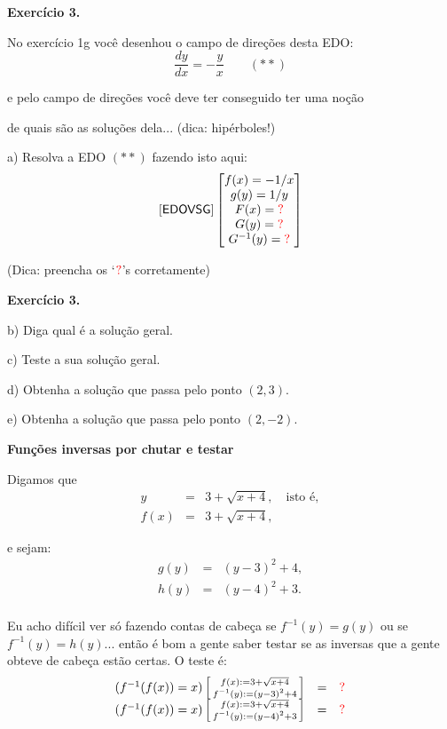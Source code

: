 \documentclass[oneside,12pt]{article}
\begin{document}
\newpage


{\bf Exercício 3.}

No exercício 1g você desenhou o campo de direções desta EDO:
%
$$ \frac{dy}{dx} = - \frac{y}{x} \qquad (**)$$

e pelo campo de direções você deve ter conseguido ter uma noção

de quais são as soluções dela... (dica: hipérboles!)

\msk

a) Resolva a EDO $(**)$ fazendo isto aqui:
%
$$\pfo{EDOVSG}
  \bmat{f(x) = -1/x \\
        g(y) = 1/y \\
        F(x) = \Rd{?} \\
        G(y) = \Rd{?} \\
        G^{-1}(y) = \Rd{?} \\
        }
$$

(Dica: preencha os `$\Rd{?}$'s corretamente)

\newpage

{\bf Exercício 3.}

b) Diga qual é a solução geral.

c) Teste a sua solução geral.

d) Obtenha a solução que passa pelo ponto $(2,3)$.

e) Obtenha a solução que passa pelo ponto $(2,-2)$.



\newpage


{\bf Funções inversas por chutar e testar}

Digamos que 
%
$$\begin{array}{rcl}
  y &=& 3 + \sqrt{x+4}, \quad \text{isto é}, \\
  f(x) &=& 3 + \sqrt{x+4},
  \end{array}
$$

e sejam:
%
$$\begin{array}{rcl}
  g(y) &=& (y-3)^2 + 4, \\
  h(y) &=& (y-4)^2 + 3. \\
  \end{array}
$$

Eu acho difícil ver só fazendo contas de cabeça se $f^{-1}(y) = g(y)$
ou se $f^{-1}(y) = h(y)$... então é bom a gente saber testar se as
inversas que a gente obteve de cabeça estão certas. O teste é:
%
$$\begin{array}{rcl}
  (f^{-1}(f(x)) = x) \bsm{ f(x) := 3 + \sqrt{x+4} \\ f^{-1}(y) := (y-3)^2 + 4 } &=& \ColorRed{?} \\
  (f^{-1}(f(x)) = x) \bsm{ f(x) := 3 + \sqrt{x+4} \\ f^{-1}(y) := (y-4)^2 + 3 } &=& \ColorRed{?} \\
  \end{array}
$$
\end{document}
